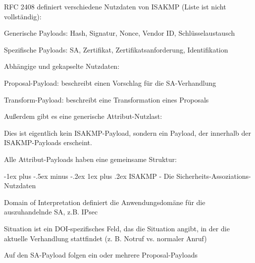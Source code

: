 \documentclass[a4paper]{article}
\makeatletter
\renewcommand{\subsubsection}{\@startsection{subsubsection}{3}{0mm}%
 {-1ex plus -.5ex minus -.2ex}%
 {1ex plus .2ex}%
 {\normalfont\small\bfseries}}
\makeatother
\begin{document}
\begin{multicols}{3}
      \begin{itemize*}
            \item RFC 2408 definiert verschiedene Nutzdaten von ISAKMP (Liste ist nicht
            vollständig):
            \begin{itemize*}
                  \item Generische Payloads: Hash, Signatur, Nonce, Vendor ID, Schlüsselaustausch
                  \item Spezifische Payloads: SA, Zertifikat, Zertifikatsanforderung, Identifikation
                  \item Abhängige und gekapselte Nutzdaten:
                  \begin{itemize*} \item Proposal-Payload: beschreibt einen Vorschlag für die SA-Verhandlung \item Transform-Payload: beschreibt eine Transformation eines Proposals \end{itemize*}
                  \item Außerdem gibt es eine generische Attribut-Nutzlast:
                  \begin{itemize*} \item Dies ist eigentlich kein ISAKMP-Payload, sondern ein Payload, der innerhalb der ISAKMP-Payloads erscheint. \item Alle Attribut-Payloads haben eine gemeinsame Struktur: %
                  \end{itemize*}
            \end{itemize*}

            \subsubsection{ISAKMP - Die
                  Sicherheits-Assoziations-Nutzdaten}
            \begin{itemize*}
                  \item       Domain of Interpretation definiert die Anwendungsdomäne für die
                  auszuhandelnde SA, z.B. IPsec
                  \item       Situation ist ein DOI-spezifisches Feld, das die Situation angibt, in
                  der die aktuelle Verhandlung stattfindet (z. B. Notruf vs. normaler
                  Anruf)
                  \item       Auf den SA-Payload folgen ein oder mehrere Proposal-Payloads
            \end{itemize*}


\end{itemize*}
\end{multicols}
\end{document}
